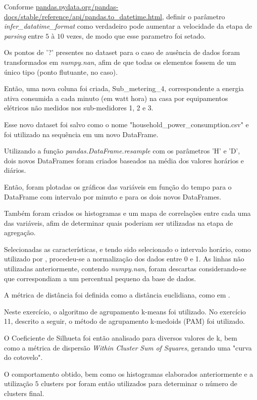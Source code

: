 Conforme \href{pandas.pydata.org/pandas-docs/stable/reference/api/pandas.to_datetime.html}{pandas.pydata.org/pandas-docs/stable/reference/api/pandas.to\_datetime.html}, definir o parâmetro \textit{infer\_datatime\_format} como verdadeiro pode aumentar a velocidade da etapa de \textit{parsing} entre $5$ à $10$ vezes, de modo que esse parametro foi setado.

Os pontos de '?' presentes no dataset para o caso de ausência de dados foram transformados em \textit{numpy.nan}, afim de que todas os elementos fossem de um único tipo (ponto flutuante, no caso).

Então, uma nova coluna foi criada, Sub\_metering\_4, correspondente  a energia ativa consumida a cada minuto (em watt hora) na casa por equipamentos elétricos não medidos nos sub-medidores 1, 2 e 3.

Esse novo dataset foi salvo como o nome "household\_power\_consumption.csv" e foi utilizado na sequência em um novo DataFrame.

Utilizando a função \textit{pandas.DataFrame.resample} com os parâmetros 'H' e 'D', dois novos DataFrames foram criados baseados na média dos valores horários e diários.

Então, foram plotadas os gráficos das variáveis em função do tempo para o DataFrame com intervalo por minuto e para os dois novos DataFrames.

Também foram criados os histogramas e um mapa de correlações entre cada uma das variáveis, afim de determinar quais poderiam ser utilizadas na etapa de agregação.

Selecionadas as características, e tendo sido selecionado o intervalo horário, como utilizado por \cite{jain_forecasting_2014} , procedeu-se a normalização dos dados entre 0 e 1. As linhas não utilizadas anteriormente, contendo \textit{numpy.nan}, foram descartas considerando-se que  correspondiam a um percentual pequeno da base de dados.

A métrica de distância foi definida como a distância euclidiana, como em \cite{beckel_revealing_cluster_2014}.

Neste exercício, o algoritmo de agrupamento k-means foi utilizado. No exercício 11, descrito a seguir, o método de agrupamento k-medoids (PAM) foi utilizado.

O Coeficiente de Silhueta foi então analisado para diversos valores de k, bem como a métrica de dispersão \textit{Within Cluster Sum of Squares}, gerando uma "curva do cotovelo". 

O comportamento obtido, bem como os histogramas elaborados anteriormente e a utilização $5$ clusters por \cite{beckel_revealing_cluster_2014} foram então utilizados para determinar o número de clusters final.

